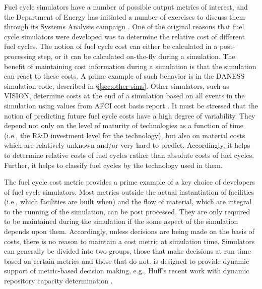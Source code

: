 Fuel cycle simulators have a number of possible output metrics of interest, and
the Department of Energy has initiated a number of exercises to discuss them
through its Systems Analysis campaign \cite{nutt_proposed_2012,
taiwo_summary_2012}. One of the original reasons that fuel cycle simulators were
developed was to determine the relative cost of different fuel cycles. The
notion of fuel cycle cost can either be calculated in a post-processing step, or
it can be calculated on-the-fly during a simulation. The benefit of maintaining
cost information during a simulation is that the simulation can react to these
costs. A prime example of such behavior is in the DANESS simulation code,
described in \S\ref{sec:other-sims}. Other simulators, such as VISION, determine
costs at the end of a simulation based on all events in the simulation using
values from AFCI cost basis report
\cite{yacout_vision_2006,shropshire_advanced_2007}. It must be stressed that the
notion of predicting future fuel cycle costs have a high degree of
variability. They depend not only on the level of maturity of technologies as a
function of time (i.e., the R\&D investment level for the technology), but also
on material costs which are relatively unknown and/or very hard to
predict. Accordingly, it helps to determine relative costs of fuel cycles rather
than absolute costs of fuel cycles. Further, it helps to classify fuel cycles by
the technology used in them.

The fuel cycle cost metric provides a prime example of a key choice of
developers of fuel cycle simulators. Most metrics outside the actual
instantiation of facilities (i.e., which facilities are built when) and the flow
of material, which are integral to the running of the simulation, can be post
processed. They are only required to be maintained during the simulation if the
some aspect of the simulation depends upon them. Accordingly, unless decisions
are being made on the basis of costs, there is no reason to maintain a cost
metric at simulation time. Simulators can generally be divided into two groups,
those that make decisions at run time based on certain metrics and those that do
not. \Cyclus is designed to provide dynamic support of metric-based decision
making, e.g., Huff's recent work with dynamic repository capacity determination
\cite{huff_integrated_2013}.

